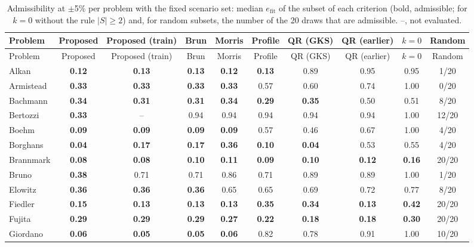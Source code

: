 \begingroup\scriptsize\setlength{\tabcolsep}{2.5pt}
\begin{longtable}{@{}lccccccccc@{}}
\caption{Admissibility at $\pm$5\% per problem with the fixed scenario set: median $e_{\mathrm{fit}}$ of the subset of each criterion (bold, admissible; for $k=0$ without the rule $|S|\ge2$) and, for random subsets, the number of the 20 draws that are admissible. --, not evaluated.}\label{tab:admisaudit2}\\
\toprule
Problem & Proposed & Proposed (train) & Brun & Morris & Profile & QR (GKS) & QR (earlier) & $k=0$ & Random \\
\midrule
\endfirsthead
\toprule
Problem & Proposed & Proposed (train) & Brun & Morris & Profile & QR (GKS) & QR (earlier) & $k=0$ & Random \\
\midrule
\endhead
Alkan & \textbf{0.12} & \textbf{0.13} & \textbf{0.13} & \textbf{0.12} & \textbf{0.13} & 0.89 & 0.95 & 0.95 & 1/20 \\
Armistead & \textbf{0.33} & \textbf{0.33} & \textbf{0.33} & \textbf{0.33} & 0.57 & 0.60 & 0.74 & 1.00 & 0/20 \\
Bachmann & \textbf{0.34} & \textbf{0.31} & \textbf{0.31} & \textbf{0.34} & \textbf{0.29} & \textbf{0.35} & 0.50 & 0.51 & 8/20 \\
Bertozzi & \textbf{0.33} & -- & 0.94 & 0.94 & 0.94 & 0.94 & 0.94 & 1.00 & 12/20 \\
Boehm & \textbf{0.09} & \textbf{0.09} & \textbf{0.09} & \textbf{0.09} & 0.57 & 0.46 & 0.67 & 1.00 & 4/20 \\
Borghans & \textbf{0.04} & \textbf{0.17} & \textbf{0.17} & \textbf{0.36} & \textbf{0.10} & \textbf{0.04} & 0.53 & 0.55 & 4/20 \\
Brannmark & \textbf{0.08} & \textbf{0.08} & \textbf{0.10} & \textbf{0.11} & \textbf{0.09} & \textbf{0.10} & \textbf{0.12} & \textbf{0.16} & 20/20 \\
Bruno & \textbf{0.38} & 0.71 & 0.71 & 0.86 & 0.71 & 0.89 & 0.89 & 1.00 & 1/20 \\
Elowitz & \textbf{0.36} & \textbf{0.36} & \textbf{0.36} & 0.65 & 0.65 & 0.69 & 0.72 & 0.77 & 8/20 \\
Fiedler & \textbf{0.15} & \textbf{0.13} & \textbf{0.13} & \textbf{0.13} & \textbf{0.35} & \textbf{0.34} & \textbf{0.13} & \textbf{0.42} & 20/20 \\
Fujita & \textbf{0.29} & \textbf{0.29} & \textbf{0.29} & \textbf{0.27} & \textbf{0.22} & \textbf{0.18} & \textbf{0.18} & \textbf{0.30} & 20/20 \\
Giordano & \textbf{0.06} & \textbf{0.05} & \textbf{0.05} & \textbf{0.06} & 0.82 & 0.78 & 0.91 & 1.00 & 10/20 \\

\end{longtable}

